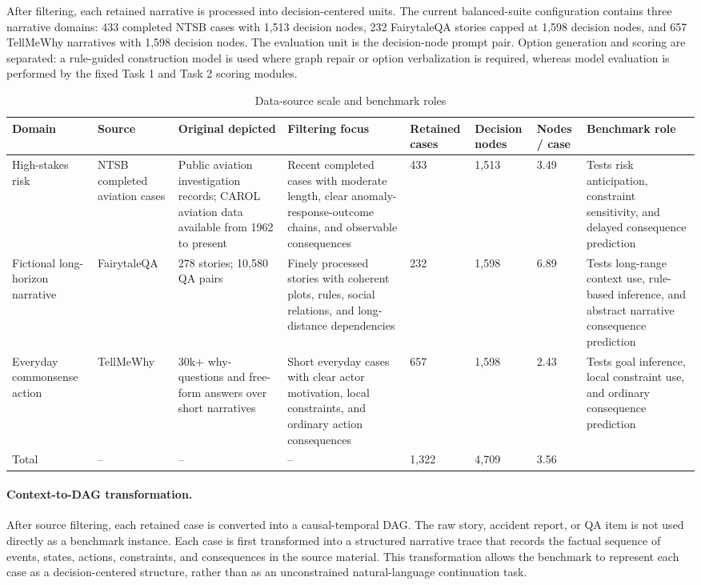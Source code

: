 \documentclass[pdflatex,sn-mathphys-num]{sn-jnl}%
\theoremstyle{thmstyleone}%
\theoremstyle{thmstyletwo}%
\theoremstyle{thmstylethree}%
\begin{document}
After filtering, each retained narrative is processed into decision-centered units. The current balanced-suite configuration contains three narrative domains: 433 completed NTSB cases with 1,513 decision nodes, 232 FairytaleQA stories capped at 1,598 decision nodes, and 657 TellMeWhy narratives with 1,598 decision nodes. The evaluation unit is the decision-node prompt pair. Option generation and scoring are separated: a rule-guided construction model is used where graph repair or option verbalization is required, whereas model evaluation is performed by the fixed Task 1 and Task 2 scoring modules.

\begin{table}[htbp]
\centering
\small
\caption{Data-source scale and benchmark roles}
\label{tab:data-source-scale-and-benchmark-roles}
\begin{tabular}{p{}p{}p{}p{}p{}p{}p{}p{}}
\toprule
Domain & Source & Original depicted & Filtering focus & Retained cases & Decision nodes & Nodes / case & Benchmark role \\
\midrule
High-stakes risk & NTSB completed aviation cases & Public aviation investigation records; CAROL aviation data available from 1962 to present & Recent completed cases with moderate length, clear anomaly-response-outcome chains, and observable consequences & 433 & 1,513 & 3.49 & Tests risk anticipation, constraint sensitivity, and delayed consequence prediction \\
Fictional long-horizon narrative & FairytaleQA & 278 stories; 10,580 QA pairs & Finely processed stories with coherent plots, rules, social relations, and long-distance dependencies & 232 & 1,598 & 6.89 & Tests long-range context use, rule-based inference, and abstract narrative consequence prediction \\
Everyday commonsense action & TellMeWhy & 30k+ why-questions and free-form answers over short narratives & Short everyday cases with clear actor motivation, local constraints, and ordinary action consequences & 657 & 1,598 & 2.43 & Tests goal inference, local constraint use, and ordinary consequence prediction \\
Total & -- & -- & -- & 1,322 & 4,709 & 3.56 &  \\
\bottomrule
\end{tabular}
\end{table}

\paragraph{Context-to-DAG transformation.}
After source filtering, each retained case is converted into a causal-temporal DAG. The raw story, accident report, or QA item is not used directly as a benchmark instance. Each case is first transformed into a structured narrative trace that records the factual sequence of events, states, actions, constraints, and consequences in the source material. This transformation allows the benchmark to represent each case as a decision-centered structure, rather than as an unconstrained natural-language continuation task.
\end{document}
